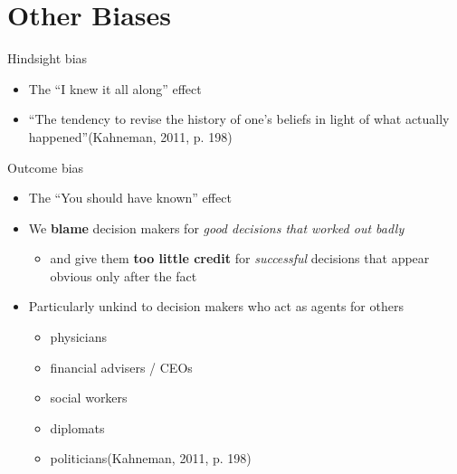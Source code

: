 \documentclass[
  ignorenonframetext,
]{beamer}
\providecommand{\tightlist}{%
  \setlength{\itemsep}{0pt}\setlength{\parskip}{0pt}}\usepackage{longtable,booktabs,array}
\begin{document}
\hypertarget{other-biases}{%
\section{Other Biases}\label{other-biases}}

\begin{frame}{Hindsight bias}
\protect\hypertarget{hindsight-bias}{}
\begin{itemize}
\item
  The ``I knew it all along'' effect
\item
  ``The tendency to revise the history of one's beliefs in light of what
  actually happened''(Kahneman, 2011, p. 198)
\end{itemize}
\end{frame}

\begin{frame}{Outcome bias}
\protect\hypertarget{outcome-bias}{}
\begin{itemize}
\item
  The ``You should have known'' effect
\item
  We \textbf{blame} decision makers for \emph{good decisions that worked
  out badly}

  \begin{itemize}
  \tightlist
  \item
    and give them \textbf{too little credit} for \emph{successful}
    decisions that appear obvious only after the fact
  \end{itemize}
\item
  Particularly unkind to decision makers who act as agents for others

  \begin{itemize}
  \tightlist
  \item
    physicians
  \item
    financial advisers / CEOs
  \item
    social workers
  \item
    diplomats
  \item
    politicians(Kahneman, 2011, p. 198)
  \end{itemize}
\end{itemize}
\end{frame}
\end{document}
